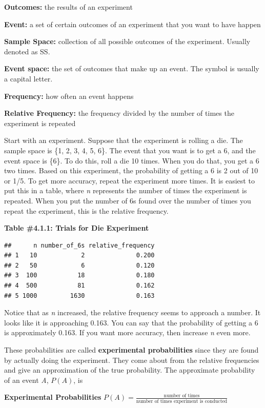 \documentclass[
]{book}
\begin{document}
\textbf{Outcomes:} the results of an experiment

\textbf{Event:} a set of certain outcomes of an experiment that you want to have happen

\textbf{Sample Space:} collection of all possible outcomes of the experiment. Usually denoted as SS.

\textbf{Event space:} the set of outcomes that make up an event. The symbol is usually a capital letter.

\textbf{Frequency:} how often an event happens

\textbf{Relative Frequency:} the frequency divided by the number of times the experiment is repeated

Start with an experiment. Suppose that the experiment is rolling a die. The sample space is \{1, 2, 3, 4, 5, 6\}. The event that you want is to get a 6, and the event space is \{6\}. To do this, roll a die 10 times. When you do that, you get a 6 two times. Based on this experiment, the probability of getting a 6 is 2 out of 10 or 1/5. To get more accuracy, repeat the experiment more times. It is easiest to put this in a table, where \emph{n} represents the number of times the experiment is repeated. When you put the number of 6s found over the number of times you repeat the experiment, this is the relative frequency.

\textbf{Table \#4.1.1: Trials for Die Experiment}

\begin{verbatim}
##      n number_of_6s relative_frequency
## 1   10            2              0.200
## 2   50            6              0.120
## 3  100           18              0.180
## 4  500           81              0.162
## 5 1000         1630              0.163
\end{verbatim}

Notice that as \emph{n} increased, the relative frequency seems to approach a number. It looks like it is approaching 0.163. You can say that the probability of getting a 6 is approximately 0.163. If you want more accuracy, then increase \emph{n} even more.

These probabilities are called \textbf{experimental probabilities} since they
are found by actually doing the experiment. They come about from the
relative frequencies and give an approximation of the true probability.
The approximate probability of an event \emph{A}, \(P(A)\), is

\textbf{Experimental Probabilities}
\(P(A)=\frac{\text{number of times} }{ \text{number of times experiment is conducted}}\)
\end{document}
